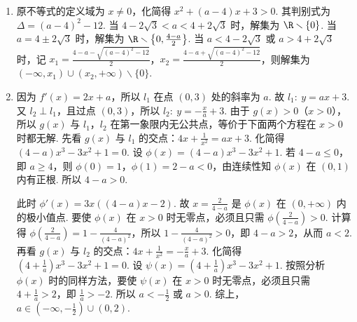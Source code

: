 \begin{solution}
\begin{enumerate}
\item 原不等式的定义域为 \( x\neq 0 \)，化简得 \( x^2+\left( a-4 \right)x+3>0 \). 其判别式为 \( \Delta=\left( a-4 \right)^2-12 \). 当 \( 4-2\sqrt{3}<a<4+2\sqrt{3} \) 时，解集为 \( \R\smallsetminus\{0\} \). 当 \( a=4\pm2\sqrt{3} \) 时，解集为 \( \R\smallsetminus\left\{ 0,\frac{4-a}{2} \right\} \). 当 \( a<4-2\sqrt{3} \) 或 \( a>4+2\sqrt{3} \) 时，记 \( x_1=\frac{4-a-\sqrt{\left( a-4 \right)^2-12}}{2} \)，\( x_2=\frac{4-a+\sqrt{\left( a-4 \right)^2-12}}{2} \)，则解集为 \( \left( -\infty,x_1 \right)\cup\left( x_2,+\infty \right)\smallsetminus\{0\} \).

\item 因为 \( f'(x)=2x+a \)，所以 \( l_1 \) 在点 \( \left( 0,3 \right) \) 处的斜率为 \( a \). 故 \( l_1:\ y=ax+3 \). 又 \( l_2 \perp l_1 \)，且过点 \( \left( 0,3 \right) \)，所以 \( l_2:\ y=-\frac{x}{a}+3 \).
由于 \( g(x)>0 \)（\( x>0 \)），所以 \( g(x) \) 与 \( l_1 \)，\( l_2 \) 在第一象限内无公共点，等价于下面两个方程在 \( x>0 \) 时都无解.
先看 \( g(x) \) 与 \( l_1 \) 的交点：\( 4x+\frac{1}{x^2}=ax+3 \). 化简得 \( \left( 4-a \right)x^3-3x^2+1=0 \). 设 \( \phi(x)=\left( 4-a \right)x^3-3x^2+1 \).
若 \( 4-a\le 0 \)，即 \( a\ge 4 \)，则 \( \phi(0)=1 \)，\( \phi(1)=2-a<0 \)，由连续性知 \( \phi(x) \) 在 \( \left( 0,1 \right) \) 内有正根. 所以 \( 4-a>0 \).

此时 \( \phi'(x)=3x\left( \left( 4-a \right)x-2 \right) \). 故 \( x=\frac{2}{4-a} \) 是 \( \phi(x) \) 在 \( \left( 0,+\infty \right) \) 内的极小值点. 要使 \( \phi(x) \) 在 \( x>0 \) 时无零点，必须且只需 \( \phi\left( \frac{2}{4-a} \right)>0 \). 计算得 \( \phi\left( \frac{2}{4-a} \right)=1-\frac{4}{\left( 4-a \right)^2} \)，所以 \( 1-\frac{4}{\left( 4-a \right)^2}>0 \)，即 \( 4-a>2 \)，从而 \( a<2 \).
再看 \( g(x) \) 与 \( l_2 \) 的交点：\( 4x+\frac{1}{x^2}=-\frac{x}{a}+3 \). 化简得 \( \left( 4+\frac{1}{a} \right)x^3-3x^2+1=0 \). 设 \( \psi(x)=\left( 4+\frac{1}{a} \right)x^3-3x^2+1 \). 按照分析 \( \phi(x) \) 时的同样方法，要使 \( \psi(x) \) 在 \( x>0 \) 时无零点，必须且只需 \( 4+\frac{1}{a}>2 \)，即 \( \frac{1}{a}>-2 \). 所以 \( a<-\frac{1}{2} \) 或 \( a>0 \).
综上，\( a\in \left( -\infty,-\frac{1}{2} \right)\cup \left( 0,2 \right) \).
\end{enumerate}
\end{solution}

